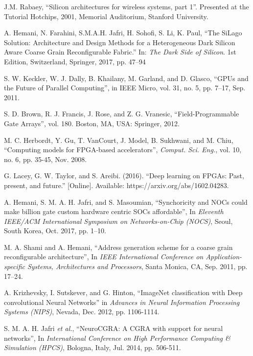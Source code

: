 \documentclass[journal]{IEEEtran}
\begin{document}
\begin{thebibliography}{9}
J.M. Rabaey, ``Silicon architectures for wireless systems, part 1''. Presented at the Tutorial Hotchips, 2001, Memorial Auditorium, Stanford University.

A. Hemani, N. Farahini, S.M.A.H. Jafri, H. Sohofi, S. Li, K. Paul, ``The SiLago Solution: Architecture and Design Methods for a Heterogeneous Dark Silicon Aware Coarse Grain Reconfigurable Fabric.'' In: \textit{The Dark Side of Silicon}. 1st Edition, Switzerland, Springer, 2017, pp. 47--94

S. W. Keckler, W. J. Dally, B. Khailany, M. Garland, and D. Glasco, ``GPUs and the Future of Parallel Computing'', in IEEE Micro, vol. 31, no. 5, pp. 7--17, Sep. 2011.

 S. D. Brown, R. J. Francis, J. Rose, and Z. G. Vranesic, ``Field-Programmable Gate Arrays'', vol. 180. Boston, MA, USA: Springer, 2012.

 M. C. Herbordt, Y. Gu, T. VanCourt, J. Model, B. Sukhwani, and M. Chiu, ``Computing models for FPGA-based accelerators'', \textit{Comput. Sci. Eng.}, vol. 10, no. 6, pp. 35-45, Nov. 2008.

 G. Lacey, G. W. Taylor, and S. Areibi. (2016). ``Deep learning on FPGAs: Past, present, and future.'' [Online]. Available: https://arxiv.org/abs/1602.04283.

A. Hemani, S. M. A. H. Jafri, and S. Masoumian, ``Synchoricity and NOCs could make billion gate custom hardware centric SOCs affordable'', In \textit{Eleventh IEEE/ACM International Symposium on Networks-on-Chip (NOCS)}, Seoul, South Korea, Oct. 2017, pp. 1--10.


M. A. Shami and A. Hemani, ``Address generation scheme for a coarse grain reconfigurable architecture'', In \textit{IEEE International Conference on Application-specific Systems, Architectures and Processors}, Santa Monica, CA, Sep. 2011, pp. 17--24.

A. Krizhevsky, I. Sutskever, and G. Hinton, ``ImageNet classification with Deep convolutional Neural Networks'' in \textit{Advances in Neural Information Processing Systems (NIPS)}, Nevada, Dec. 2012, pp. 1106-1114.

S. M. A. H. Jafri \textit{et al.}, ``NeuroCGRA: A CGRA with support for neural networks'', In \textit{International Conference on High Performance Computing \& Simulation (HPCS)}, Bologna, Italy, Jul. 2014, pp. 506-511.


\end{thebibliography}
\end{document}
